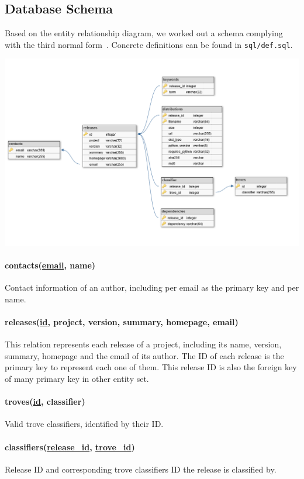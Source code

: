 \documentclass[a4paper,12pt]{article}
\newcommand{\id}[1]{\underline{#1\_id}}
\begin{document}
\newpage
\subsection{Database Schema}
Based on the entity relationship diagram, we worked out a schema complying
with the third normal form~\cite{3nf}.  Concrete definitions can be found in
\verb|sql/def.sql|.
\begin{center}
  \includegraphics[width=\textwidth]{schema.png}
\end{center}

\paragraph{contacts(\underline{email}, name)} Contact information of an author,
including per email as the primary key and per name.

\paragraph{releases(\underline{id}, project, version, summary, homepage, email)}
This relation represents each release of a project, including its name, version,
summary, homepage and the email of its author.  The ID of each release is
the primary key to represent each one of them.  This release ID is also
the foreign key of many primary key in other entity set.

\paragraph{troves(\underline{id}, classifier)} Valid trove classifiers,
identified by their ID.

\paragraph{classifiers(\id{release}, \id{trove})}
Release ID and corresponding trove classifiers ID the release is classified by.
\end{document}
